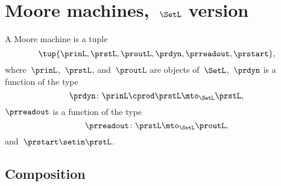 
\section{Moore machines,~$\SetL$ version}

\begin{definition}
    \label{def:moore_machine_3rd}
    A Moore machine is a tuple
    \begin{equation}
        \label{eq:moore-tuple-improved-again}
        \tup{\prinL,\prstL,\proutL,\prdyn,\prreadout,\prstart},
    \end{equation}
    where~$\prinL$,~$\prstL$, and~$\proutL$ are objects of~$\SetL$,~$\prdyn$ is a function of the type
    \begin{equation}
        \prdyn \colon \prinL \cprod \prstL \mto_{\SetL} \prstL,
    \end{equation}
    $\prreadout$ is a function of the type
    \begin{equation}
        \prreadout \colon \prstL \mto_{\SetL} \proutL,
    \end{equation}
    and~$\prstart \setin \prstL$.
\end{definition}

\subsection{Composition}
\label{sec:composition-of-Moore-machines}

